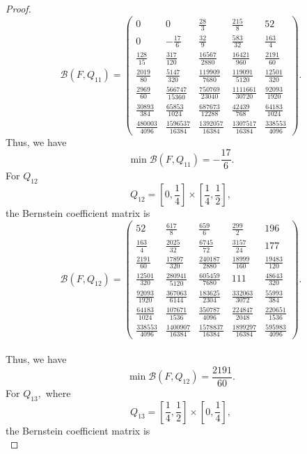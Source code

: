\documentclass[10pt,a4paper]{amsart}
\begin{document}
\begin{proof}
\[
\mathcal B(F,Q_{11})=
\begin{pmatrix}
	0 & 0 & \frac{28}{3} & \frac{215}{8} & 52\\[5mm]
	0 & -\frac{17}{6} & \frac{32}{9} & \frac{583}{32} & \frac{163}{4}\\[5mm]
	\frac{128}{15} & \frac{317}{120} & \frac{16567}{2880} & \frac{16421}{960} & \frac{2191}{60}\\[5mm]
	\frac{2019}{80} & \frac{5147}{320} & \frac{119909}{7680} & \frac{119091}{5120} & \frac{12501}{320}\\[5mm]
	\frac{2969}{60} & \frac{566747}{15360} & \frac{750769}{23040} & \frac{1111661}{30720} & \frac{92093}{1920}\\[5mm]
	\frac{30893}{384} & \frac{65853}{1024} & \frac{687673}{12288} & \frac{42439}{768} & \frac{64183}{1024}\\[5mm]
	\frac{480003}{4096} & \frac{1596537}{16384} & \frac{1392057}{16384} & \frac{1307517}{16384} & \frac{338553}{4096}
\end{pmatrix}.
\]
Thus, we have
\[
\min \mathcal B(F,Q_{11})=-\frac{17}{6}.
\]
For $Q_{12}$
\[
Q_{12}=\left[0,\frac14\right]\times\left[\frac14,\frac12\right],
\]
the Bernstein coefficient matrix is\\
\[
\mathcal B(F,Q_{12})=
\begin{pmatrix}
	52 & \frac{617}{8} & \frac{659}{6} & \frac{299}{2} & 196\\[5mm]
	\frac{163}{4} & \frac{2025}{32} & \frac{6745}{72} & \frac{3157}{24} & 177\\[5mm]
	\frac{2191}{60} & \frac{17897}{320} & \frac{240187}{2880} & \frac{18999}{160} & \frac{19483}{120}\\[5mm]
	\frac{12501}{320} & \frac{280941}{5120} & \frac{605459}{7680} & 111 & \frac{48643}{320}\\[5mm]
	\frac{92093}{1920} & \frac{367063}{6144} & \frac{183625}{2304} & \frac{332063}{3072} & \frac{55993}{384}\\[5mm]
	\frac{64183}{1024} & \frac{107671}{1536} & \frac{350787}{4096} & \frac{224847}{2048} & \frac{220651}{1536}\\[5mm]
	\frac{338553}{4096} & \frac{1400907}{16384} & \frac{1578837}{16384} & \frac{1899297}{16384} & \frac{595983}{4096}
\end{pmatrix}.
\]\\
Thus, we have
\[
\min \mathcal B(F,Q_{12})=\frac{2191}{60}.
\]
For $Q_{13},$ where
\[
Q_{13}=\left[\frac14,\frac12\right]\times\left[0,\frac14\right],
\]
the Bernstein coefficient matrix is\\

\end{proof}
\end{document}
